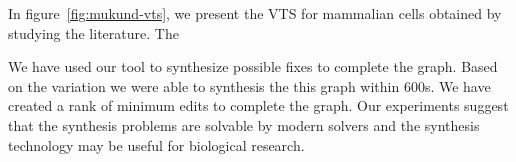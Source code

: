 
  
In figure~\ref{fig:mukund-vts}, we present the VTS for mammalian cells
obtained by studying the literature.
%
The 


We have used our tool to synthesize possible fixes to complete the
graph. Based on the variation we were able to synthesis the this graph
within 600s. We have created a rank of minimum edits to complete the
graph. Our experiments suggest that the synthesis problems are
solvable by modern solvers and the synthesis technology may be useful
for biological research.

